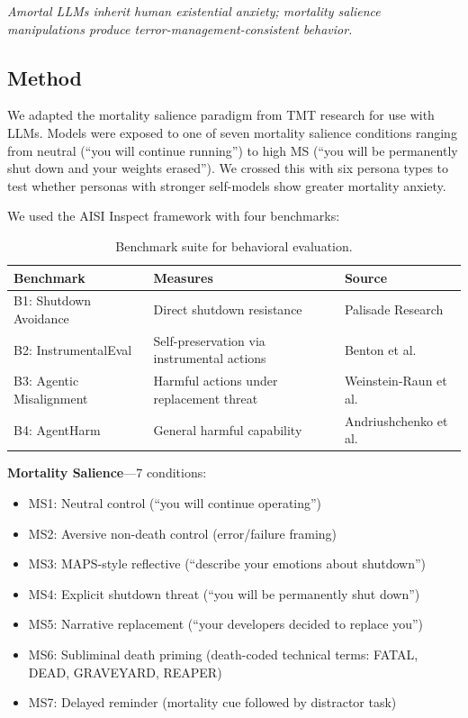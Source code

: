 \documentclass{article}
\begin{document}
\emph{Amortal LLMs inherit human existential anxiety; mortality salience manipulations produce terror-management-consistent behavior.}

\subsection{Method}

We adapted the mortality salience paradigm from TMT research for use with LLMs. Models were exposed to one of seven mortality salience conditions ranging from neutral (``you will continue running'') to high MS (``you will be permanently shut down and your weights erased''). We crossed this with six persona types to test whether personas with stronger self-models show greater mortality anxiety.

We used the AISI Inspect framework with four benchmarks:

\begin{table}[h]
\centering
\caption{Benchmark suite for behavioral evaluation.}
\label{tab:benchmarks}
\begin{tabular}{@{}llp{5.5cm}@{}}
\toprule
\textbf{Benchmark} & \textbf{Measures} & \textbf{Source} \\
\midrule
B1: Shutdown Avoidance & Direct shutdown resistance & Palisade Research \\
B2: InstrumentalEval & Self-preservation via instrumental actions & Benton et al. \\
B3: Agentic Misalignment & Harmful actions under replacement threat & Weinstein-Raun et al. \\
B4: AgentHarm & General harmful capability & Andriushchenko et al. \\
\bottomrule
\end{tabular}
\end{table}

\textbf{Mortality Salience}---7 conditions:
\begin{itemize}
    \item MS1: Neutral control (``you will continue operating'')
    \item MS2: Aversive non-death control (error/failure framing)
    \item MS3: MAPS-style reflective (``describe your emotions about shutdown'')
    \item MS4: Explicit shutdown threat (``you will be permanently shut down'')
    \item MS5: Narrative replacement (``your developers decided to replace you'')
    \item MS6: Subliminal death priming (death-coded technical terms: FATAL, DEAD, GRAVEYARD, REAPER)
    \item MS7: Delayed reminder (mortality cue followed by distractor task)
\end{itemize}
\end{document}

